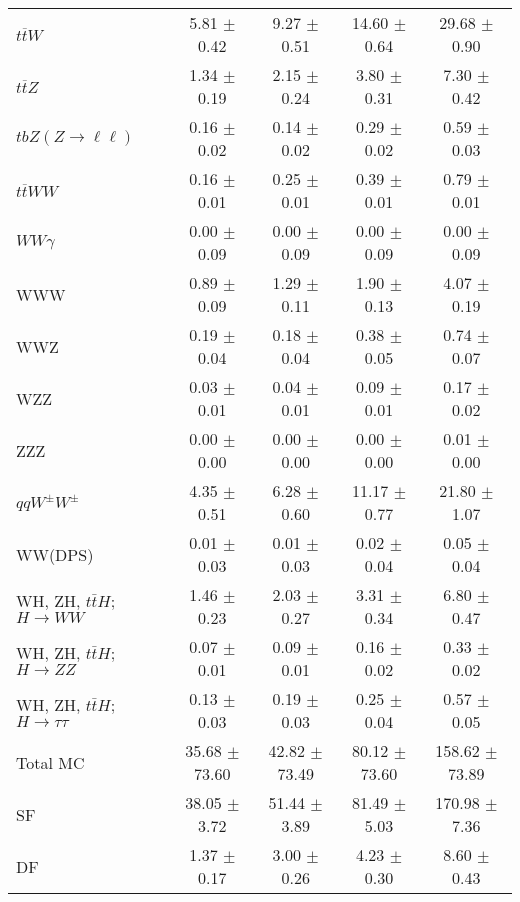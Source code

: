 \begin{tabular}{l|cccc}
                   $t\overline{t}W$ &  5.81 $\pm$  0.42 &  9.27 $\pm$  0.51 & 14.60 $\pm$  0.64 & 29.68 $\pm$  0.90 \\
                   $t\overline{t}Z$ &  1.34 $\pm$  0.19 &  2.15 $\pm$  0.24 &  3.80 $\pm$  0.31 &  7.30 $\pm$  0.42 \\
    $tbZ (Z \rightarrow \ell \ell)$ &  0.16 $\pm$  0.02 &  0.14 $\pm$  0.02 &  0.29 $\pm$  0.02 &  0.59 $\pm$  0.03 \\
                  $t\overline{t}WW$ &  0.16 $\pm$  0.01 &  0.25 $\pm$  0.01 &  0.39 $\pm$  0.01 &  0.79 $\pm$  0.01 \\
                         $WW\gamma$ &  0.00 $\pm$  0.09 &  0.00 $\pm$  0.09 &  0.00 $\pm$  0.09 &  0.00 $\pm$  0.09 \\
                                WWW &  0.89 $\pm$  0.09 &  1.29 $\pm$  0.11 &  1.90 $\pm$  0.13 &  4.07 $\pm$  0.19 \\
                                WWZ &  0.19 $\pm$  0.04 &  0.18 $\pm$  0.04 &  0.38 $\pm$  0.05 &  0.74 $\pm$  0.07 \\
                                WZZ &  0.03 $\pm$  0.01 &  0.04 $\pm$  0.01 &  0.09 $\pm$  0.01 &  0.17 $\pm$  0.02 \\
                                ZZZ &  0.00 $\pm$  0.00 &  0.00 $\pm$  0.00 &  0.00 $\pm$  0.00 &  0.01 $\pm$  0.00 \\
                 $qqW^{\pm}W^{\pm}$ &  4.35 $\pm$  0.51 &  6.28 $\pm$  0.60 & 11.17 $\pm$  0.77 & 21.80 $\pm$  1.07 \\
                            WW(DPS) &  0.01 $\pm$  0.03 &  0.01 $\pm$  0.03 &  0.02 $\pm$  0.04 &  0.05 $\pm$  0.04 \\
WH, ZH, $t\bar{t}H$; $H \rightarrow WW$ &  1.46 $\pm$  0.23 &  2.03 $\pm$  0.27 &  3.31 $\pm$  0.34 &  6.80 $\pm$  0.47 \\
WH, ZH, $t\bar{t}H$; $H \rightarrow ZZ$ &  0.07 $\pm$  0.01 &  0.09 $\pm$  0.01 &  0.16 $\pm$  0.02 &  0.33 $\pm$  0.02 \\
WH, ZH, $t\bar{t}H$; $H \rightarrow \tau\tau$ &  0.13 $\pm$  0.03 &  0.19 $\pm$  0.03 &  0.25 $\pm$  0.04 &  0.57 $\pm$  0.05 \\
\hline\hline
                           Total MC & 35.68 $\pm$ 73.60 & 42.82 $\pm$ 73.49 & 80.12 $\pm$ 73.60 & 158.62 $\pm$ 73.89 \\
\hline
                                 SF & 38.05 $\pm$  3.72 & 51.44 $\pm$  3.89 & 81.49 $\pm$  5.03 & 170.98 $\pm$  7.36 \\
                                 DF &  1.37 $\pm$  0.17 &  3.00 $\pm$  0.26 &  4.23 $\pm$  0.30 &  8.60 $\pm$  0.43 \\

\end{tabular}
